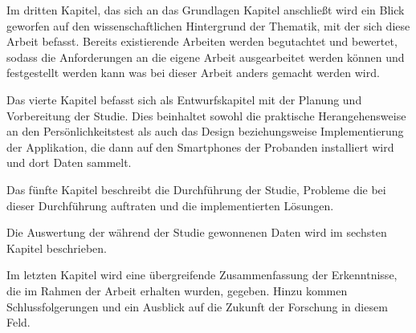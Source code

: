 
Im dritten Kapitel, das sich an das Grundlagen Kapitel anschließt wird ein Blick geworfen auf den wissenschaftlichen Hintergrund der Thematik,
 mit der sich diese Arbeit befasst.
Bereits existierende Arbeiten werden begutachtet und bewertet, sodass die Anforderungen an die eigene Arbeit ausgearbeitet werden können und festgestellt werden kann was bei dieser Arbeit anders gemacht werden wird.
\par

Das vierte Kapitel befasst sich als Entwurfskapitel mit der Planung und Vorbereitung der Studie.
Dies beinhaltet sowohl die praktische Herangehensweise an den Persönlichkeitstest als auch das Design beziehungsweise Implementierung der Applikation,
die dann auf den Smartphones der Probanden installiert wird und dort Daten sammelt. 

Das fünfte Kapitel beschreibt die Durchführung der Studie, Probleme die bei dieser Durchführung auftraten und die implementierten Lösungen.

Die Auswertung der während der Studie gewonnenen Daten wird im sechsten Kapitel beschrieben.

Im letzten Kapitel wird eine übergreifende Zusammenfassung der Erkenntnisse, die im Rahmen der Arbeit erhalten wurden, gegeben.
Hinzu kommen Schlussfolgerungen und ein Ausblick auf die Zukunft der Forschung in diesem Feld.


